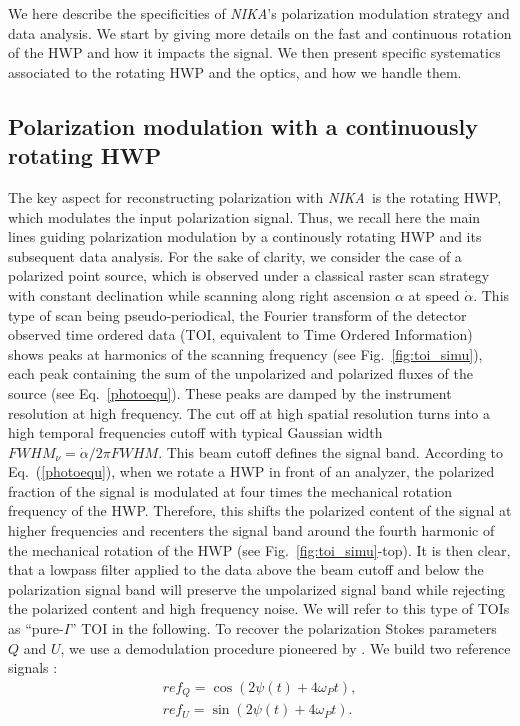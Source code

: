 \documentclass[twocolumn, traditabstract]{aa}
\newcommand{\nika}{{\it NIKA}}
\begin{document}
We here describe the specificities of \nika's polarization modulation strategy
and data analysis. We start by giving more details on the fast and continuous
rotation of the HWP and how it impacts the signal. We then present specific
systematics associated to the rotating HWP and the optics, and how we handle
them. 
 
\subsection{Polarization modulation with a continuously rotating HWP}
\label{se:lockin}
The key aspect for reconstructing polarization with \nika\ is the rotating HWP,
which modulates the input polarization signal.  Thus, we recall here the main
lines guiding polarization modulation by a continously rotating HWP and its
subsequent data analysis. For the sake of clarity, we consider the case of a
polarized point source, which is observed under a classical raster scan strategy
with constant declination while scanning along right ascension $\alpha$ at speed
$\dot{\alpha}$. This type of scan being pseudo-periodical, the Fourier transform
of the detector observed time ordered data (TOI, equivalent to Time Ordered Information) shows peaks at harmonics of the
scanning frequency (see Fig.~\ref{fig:toi_simu}), each peak containing the sum of
the unpolarized and polarized fluxes of the source (see
Eq.~\ref{photoequ}). These peaks are damped by the instrument resolution at
high frequency. The cut off at
high spatial resolution turns into a high temporal frequencies cutoff with
typical Gaussian width $FWHM_\nu = \dot{\alpha}/2\pi FWHM$. This beam cutoff
defines the signal band. According to Eq.~(\ref{photoequ}), when we rotate a HWP
in front of an analyzer, the polarized fraction of the signal is modulated at
four times the mechanical rotation frequency of the HWP. Therefore, this shifts the
polarized content of the signal at higher frequencies and recenters the signal
band around the fourth harmonic of the mechanical rotation of the HWP (see
Fig.~\ref{fig:toi_simu}-top). It is then clear, that a lowpass filter applied to
the data above the beam cutoff and below the polarization signal band will
preserve the unpolarized signal band while rejecting the polarized content and
high frequency noise. We will refer to this type of TOIs as ``pure-$I$''
TOI in the following. To recover the polarization Stokes parameters $Q$
and $U$, we use a demodulation procedure pioneered by \cite{johnson2007}. We
build two reference signals :
\begin{eqnarray}
ref_Q = \cos(2\psi(t) + 4\omega_Pt), \nonumber \\
ref_U = \sin(2\psi(t) + 4\omega_Pt).
\end{eqnarray}
\end{document}
